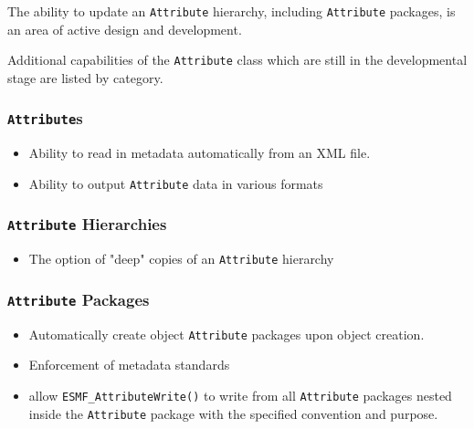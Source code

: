 %

The ability to update an {\tt Attribute} hierarchy, including {\tt Attribute} packages, is an area of active design and development.

Additional capabilities of the {\tt Attribute} class which are still in the developmental stage are listed by category.
 
\subsubsection{{\tt Attribute}s}

\begin{itemize}
\item Ability to read in metadata automatically from an XML file.
\item Ability to output {\tt Attribute} data in various formats
\end{itemize}

\subsubsection{{\tt Attribute} Hierarchies}

\begin{itemize}
\item The option of "deep" copies of an {\tt Attribute} hierarchy
\end{itemize}

\subsubsection{{\tt Attribute} Packages}

\begin{itemize}
\item Automatically create object {\tt Attribute} packages upon object creation.
\item Enforcement of metadata standards
\item allow {\tt ESMF\_AttributeWrite()} to write from all {\tt Attribute} packages nested inside the {\tt Attribute} package with the specified convention and purpose.
\end{itemize}
